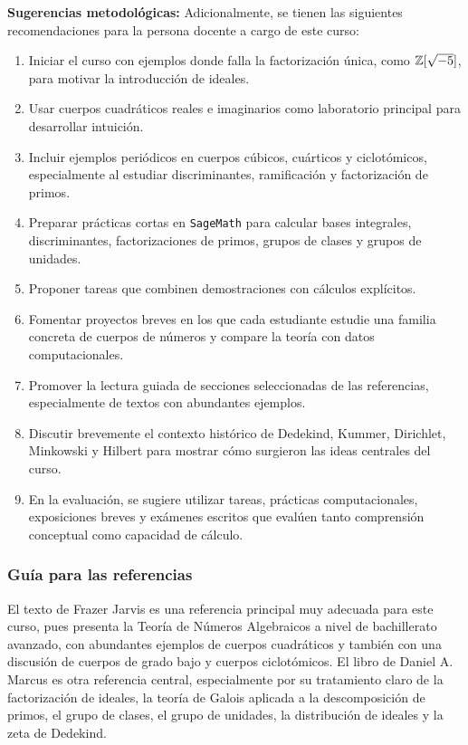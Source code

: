 \begin{refsection}
\textbf{Sugerencias metodológicas:} Adicionalmente, se tienen las siguientes recomendaciones para la persona docente a cargo de este curso:
\begin{enumerate}
    \item Iniciar el curso con ejemplos donde falla la factorización única, como $\mathbb{Z}[\sqrt{-5}]$, para motivar la introducción de ideales.
    \item Usar cuerpos cuadráticos reales e imaginarios como laboratorio principal para desarrollar intuición.
    \item Incluir ejemplos periódicos en cuerpos cúbicos, cuárticos y ciclotómicos, especialmente al estudiar discriminantes, ramificación y factorización de primos.
    \item Preparar prácticas cortas en \texttt{SageMath} para calcular bases integrales, discriminantes, factorizaciones de primos, grupos de clases y grupos de unidades.
    \item Proponer tareas que combinen demostraciones con cálculos explícitos.
    \item Fomentar proyectos breves en los que cada estudiante estudie una familia concreta de cuerpos de números y compare la teoría con datos computacionales.
    \item Promover la lectura guiada de secciones seleccionadas de las referencias, especialmente de textos con abundantes ejemplos.
    \item Discutir brevemente el contexto histórico de Dedekind, Kummer, Dirichlet, Minkowski y Hilbert para mostrar cómo surgieron las ideas centrales del curso.
    \item En la evaluación, se sugiere utilizar tareas, prácticas computacionales, exposiciones breves y exámenes escritos que evalúen tanto comprensión conceptual como capacidad de cálculo.
\end{enumerate}



\subsubsection*{Guía para las referencias}

El texto de Frazer Jarvis \cite{Jar14} es una referencia principal muy adecuada para este curso, pues presenta la Teoría de Números Algebraicos a nivel de bachillerato avanzado, con abundantes ejemplos de cuerpos cuadráticos y también con una discusión de cuerpos de grado bajo y cuerpos ciclotómicos. El libro de Daniel A. Marcus \cite{Mar18} es otra referencia central, especialmente por su tratamiento claro de la factorización de ideales, la teoría de Galois aplicada a la descomposición de primos, el grupo de clases, el grupo de unidades, la distribución de ideales y la zeta de Dedekind.


\end{refsection}
